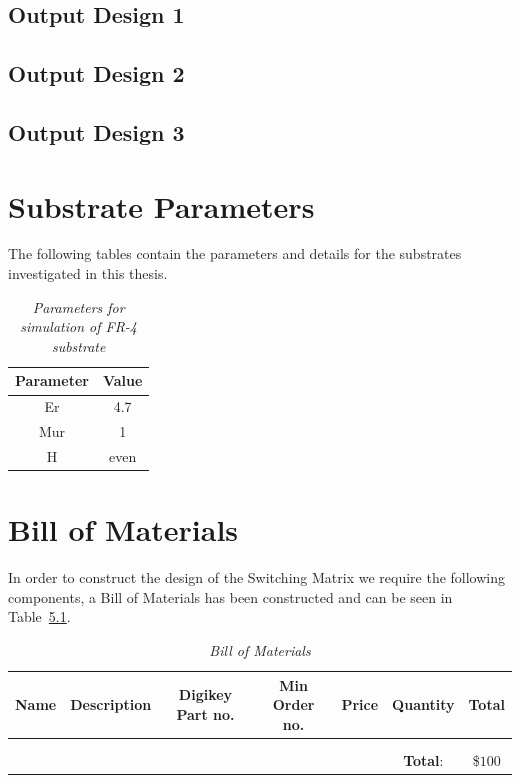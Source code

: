 \documentclass[12pt,openany,a4paper]{book}
\newcommand{\tab}[1]  {Table~\ref{#1}}		%
\begin{document}
\section{Output Design 1}	\label{sec:pcb_outdesign1}

\section{Output Design 2}	\label{sec:pcb_outdesign2}

\section{Output Design 3}	\label{sec:pcb_outdesign3}
















\chapter{Substrate Parameters}
The following tables contain the parameters and details for the substrates investigated in this thesis. \newline
\begin{table}[!htbp]
\centering
\begin{tabular}{|c|c|}
\hline
Parameter 	& Value \\
\hline
Er 	& 4.7 	\\
Mur 	& 1 \\
H 	& even 	\\
\hline
\end{tabular}
\label{tab:substrate}
\caption{\sl Parameters for simulation of FR-4 substrate}
\end{table}

\chapter{Bill of Materials}
In order to construct the design of the Switching Matrix we require the following components, a Bill of Materials has been constructed and can be seen in \tab{tab:bom}.
\begin{table}[!htbp]
\centering
\begin{tabular}{|c|c|c|c|c|c|c|}
\hline
Name & Description & Digikey Part no. & Min Order no. & Price & Quantity & Total \\
\hline
& & & & & & \\
\hline
\multicolumn{7}{c}{} \\
\hline
\multicolumn{5}{|c}{} & \textbf{Total}: & \$$100$\\
\hline
\end{tabular}
\label{tab:bom}
\caption{\sl Bill of Materials}
\end{table}
\end{document}
